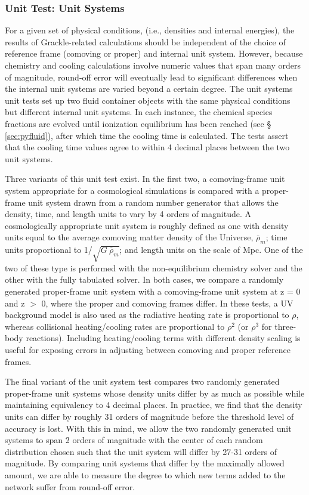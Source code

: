 \subsubsection{Unit Test: Unit Systems}
\label{sec:test-units}

For a given set of physical conditions, (i.e., densities and internal
energies), the results of Grackle-related calculations should be
independent of the choice of reference frame (comoving or proper) and
internal unit system.  However, because chemistry and cooling
calculations involve numeric values that span many orders of
magnitude, round-off error will eventually lead to significant
differences when the internal unit systems are varied beyond a certain
degree.  The unit systems unit tests set up two fluid container
objects with the same physical conditions but different internal unit
systems.  In each instance, the chemical species fractions are evolved
until ionization equilibrium has been reached (see \S
\ref{sec:pyfluid}), after which time the cooling time is calculated.
The tests assert that the cooling time values agree to within 4
decimal places between the two unit systems.

Three variants of this unit test exist.  In the first two, a
comoving-frame unit system appropriate for a cosmological simulations
is compared with a proper-frame unit system drawn from a random number
generator that allows the density, time, and length units to vary by 4
orders of magnitude.  A cosmologically appropriate unit system is
roughly defined as one with density units equal to the average
comoving matter density of the Universe, $\bar{\rho}_{m}$; time units
proportional to 1/$\sqrt{G\ \bar{\rho}_{m}}$; and length units on the
scale of Mpc.  One of the two of these type is performed with the
non-equilibrium chemistry solver and the other with the fully
tabulated solver.  In both cases, we compare a randomly generated
proper-frame unit system with a comoving-frame unit system at z = 0
and z $>$ 0, where the proper and comoving frames differ.  In these
tests, a UV background model is also used as the radiative heating
rate is proportional to $\rho$, whereas collisional heating/cooling
rates are proportional to $\rho^{2}$ (or $\rho^{3}$ for three-body
reactions).  Including heating/cooling terms with different density
scaling is useful for exposing errors in adjusting between comoving
and proper reference frames.

The final variant of the unit system test compares two randomly
generated proper-frame unit systems whose density units differ by as
much as possible while maintaining equivalency to 4 decimal places.
In practice, we find that the density units can differ by roughly 31
orders of magnitude before the threshold level of accuracy is lost.
With this in mind, we allow the two randomly generated unit systems to
span 2 orders of magnitude with the center of each random distribution
chosen such that the unit system will differ by 27-31 orders of
magnitude.  By comparing unit systems that differ by the maximally
allowed amount, we are able to measure the degree to which new terms
added to the network suffer from round-off error.


